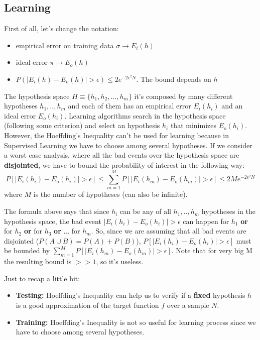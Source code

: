 \subsection{Learning}
First of all, let's change the notation:
\begin{itemize}
    \item empirical error on training data $\sigma \rightarrow E_{i}(h)$
    \item ideal error $\pi \rightarrow E_{o}(h)$
    \item $P(|E_{i}(h) - E_{o}(h)| > \epsilon) \leq 2e^{-2\epsilon^{2}N}$. The bound depends on $h$
\end{itemize}
The hypothesis space $H \equiv \{h_{1}, h_{2},...,h_{m}\}$ it's composed by many different hypotheses $h_{1},..,h_{m}$ and each of them has an empirical error $E_{i}(h_{i})$ and an ideal error $E_{o}(h_{i})$. Learning algorithms search in the hypothesis space (following some criterion) and select an hypothesis $h_{i}$ that minimizes $E_{o}(h_{i})$. However, the Hoeffding's Inequality can't be used for learning because in Supervised Learning we have to choose among several hypotheses. If we consider a worst case analysis, where all the bad events over the hypothesis space are \textbf{disjointed}, we have to bound the probability of interest in the following way:
\[P[|E_{i}(h_{i}) - E_{o}(h_{i})| > \epsilon] \leq \sum_{m=1}^{M}P[|E_{i}(h_{m}) - E_{o}(h_{m})| > \epsilon] \leq 2Me^{-2\epsilon^{2}N}\] where $M$ is the number of hypotheses (can also be infinite). \newline

The formula above says that since $h_{i}$ can be any of all $h_{1},..,h_{m}$ hypotheses in the hypothesis space, the bad event $|E_{i}(h_{i}) - E_{o}(h_{i})| > \epsilon$ can happen for $h_{1}$ \textbf{or} for $h_{2}$ \textbf{or} for $h_{3}$ \textbf{or} ... for $h_{m}$. So, since we are assuming that all bad events are disjointed ($P(A \cup B) = P(A) + P(B)$), $P[|E_{i}(h_{i}) - E_{o}(h_{i})| > \epsilon]$ must be bounded by $\sum_{m=1}^{M}P[|E_{i}(h_{m}) - E_{o}(h_{m})| > \epsilon]$. Note that for very big M the resulting bound is $>>1$, so it's useless.\newline

Just to recap a little bit:
\begin{itemize}
    \item \textbf{Testing:} Hoeffding's Inequality can help us to verify if a \textbf{fixed} hypothesis $h$ is a good approximation of the target function $f$ over a sample $N$.
    \item \textbf{Training:} Hoeffding's Inequality is not so useful for learning process since we have to choose among several hypotheses.
\end{itemize}

